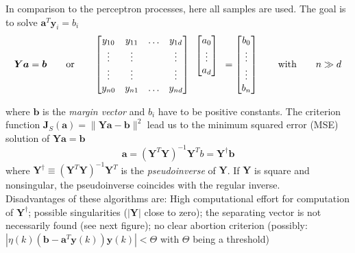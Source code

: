     In comparison to the perceptron processes, here all samples are used. 
    The goal is to solve $\bm a^T \bm y_i = b_i$
    \begin{equation*}
    \bm Y \bm a = \bm b
    \qquad \text{or} \qquad
    \begin{bmatrix}
      y_{10} & y_{11} & \ldots & y_{1d}\\
      \vdots &\vdots & & \vdots\\
      \vdots &\vdots & & \vdots\\
      y_{n0} & y_{n1} & \ldots & y_{nd}\\
    \end{bmatrix}
    \begin{array}{c}
    \begin{bmatrix}
    	a_0\\
    	\vdots\\
    	a_d
    \end{bmatrix}\\
    \vphantom{\vdots}\\
    \end{array} = 
    \begin{bmatrix}
    	b_0\\
    	\vdots\\
    	\vdots\\
    	b_n
    \end{bmatrix} \qquad \text{with} \qquad n \gg d
    \end{equation*}
    
    where $\bm{b}$ is the \emph{margin vector} and $b_i$ have to be positive constants. 
    The criterion function $\bm J_S(\bm a)=\|\bm Y \bm a - \bm b \|^2$ lead 
    us to the minimum squared error (MSE) solution of $\bm Y \bm a = \bm b$
    \begin{equation*}
        \bm a = (\bm Y^T \bm Y)^{-1} \bm Y^T b = \bm Y^\dagger \bm b
    \end{equation*}
    where $\bm Y^\dagger \equiv (\bm Y^T \bm Y)^{-1} \bm Y^T$ is the \emph{pseudoinverse} of $\bm Y$.
    If $\bm Y$ is square and nonsingular, the pseudoinverse coincides with the regular inverse. \\

    Disadvantages of these algorithms are: High computational effort for computation of $\bm Y^\dagger$;
    possible singularities ($|\bm Y|$ close to zero); the separating vector is not necessarily found (see next figure);
    no clear abortion criterion (possibly: $|\eta(k) (\bm b - \bm a^T \bm y(k)) \bm y(k)| < \Theta$ with $\Theta$ being a threshold)\\
    
